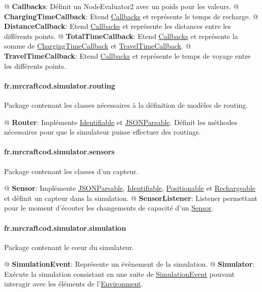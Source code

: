\documentclass[final]{polytech/polytech}
\newcommand{\class}[1]{\textbf{#1}\label{class:#1}}
\newcommand{\klass}[1]{\hyperref[class:#1]{#1}}
\begin{document}
				\begin{easylist}
					@ \class{Callbacks}: Définit un NodeEvaluator2 avec un poids pour les valeurs.
					@ \class{ChargingTimeCallback}: Etend \klass{Callbacks} et représente le temps de recharge.
					@ \class{DistanceCallback}: Etend \klass{Callbacks} et représente les distances entre les différents points.
					@ \class{TotalTimeCallback}: Etend \klass{Callbacks} et représente la somme de \klass{ChargingTimeCallback} et \klass{TravelTimeCallback}.
					@ \class{TravelTimeCallback}: Etend \klass{Callbacks} et représente le temps de voyage entre les différents points.
				\end{easylist}
				
			\paragraph{fr.mrcraftcod.simulator.routing}
				Package contenant les classes nécessaires à la définition de modèles de routing.
				
				\begin{easylist}
					@ \class{Router}: Implémente \klass{Identifiable} et \klass{JSONParsable}. 
					Définit les méthodes nécessaires pour que le simulateur puisse effectuer des routings.
				\end{easylist}
				
			\paragraph{fr.mrcraftcod.simulator.sensors}
				Package contenant les classes d'un capteur.
				
				\begin{easylist}
					@ \class{Sensor}: Implémente \klass{JSONParsable}, \klass{Identifiable}, \klass{Positionable} et \klass{Rechargeable} et définit un capteur dans la simulation.
					@ \class{SensorListener}: Listener permettant pour le moment d'écouter les changements de capacité d'un \klass{Sensor}.
				\end{easylist}
				
			\paragraph{fr.mrcraftcod.simulator.simulation}
				Package contenant le c\oe ur du simulateur.
				
				\begin{easylist}
					@ \class{SimulationEvent}: Représente un évènement de la simulation.
					@ \class{Simulator}: Exécute la simulation consistant en une suite de \klass{SimulationEvent} pouvant interagir avec les éléments de l'\klass{Environment}.
				\end{easylist}
				
\end{document}

